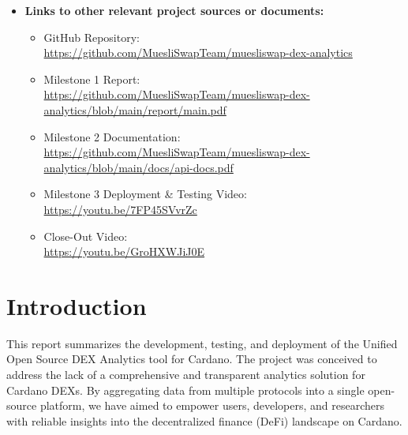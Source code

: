 \documentclass[11pt]{article}
\begin{document}
\begin{itemize}[leftmargin=1cm]
    \item \textbf{Links to other relevant project sources or documents:}
    \begin{itemize}
        \item GitHub Repository:\\ \url{https://github.com/MuesliSwapTeam/muesliswap-dex-analytics}
        \item Milestone 1 Report:\\ \url{https://github.com/MuesliSwapTeam/muesliswap-dex-analytics/blob/main/report/main.pdf}
        \item Milestone 2 Documentation:\\ \url{https://github.com/MuesliSwapTeam/muesliswap-dex-analytics/blob/main/docs/api-docs.pdf}
        \item Milestone 3 Deployment \& Testing Video:\\
        \url{https://youtu.be/7FP45SVvrZc}
        \item Close-Out Video:\\
        \url{https://youtu.be/GroHXWJiJ0E}
    \end{itemize}
\end{itemize}

\section{Introduction}
This report summarizes the development, testing, and deployment of the Unified Open Source DEX Analytics tool for Cardano. The project was conceived to address the lack of a comprehensive and transparent analytics solution for Cardano DEXs. By aggregating data from multiple protocols into a single open-source platform, we have aimed to empower users, developers, and researchers with reliable insights into the decentralized finance (DeFi) landscape on Cardano.
\end{document}
